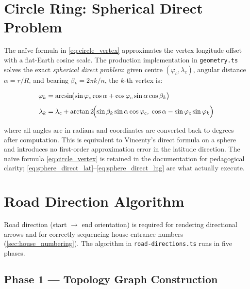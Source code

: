\documentclass[12pt,a4paper]{article}
\theoremstyle{definition}
\theoremstyle{plain}
\theoremstyle{remark}
\begin{document}
\section{Circle Ring: Spherical Direct Problem}
\label{sec:circle_ring_correct}

The na\"ive formula in \cref{eq:circle_vertex} approximates the vertex
longitude offset with a flat-Earth cosine scale. The production implementation
in \texttt{geometry.ts} solves the exact \emph{spherical direct problem}:
given centre $(\varphi_c, \lambda_c)$, angular distance
$\alpha = r / R$, and bearing $\beta_k = 2\pi k / n$, the $k$-th vertex is:

\begin{align}
  \varphi_k &= \arcsin\!\bigl(
      \sin\varphi_c \cos\alpha
    + \cos\varphi_c \sin\alpha \cos\beta_k
  \bigr)
  \label{eq:sphere_direct_lat}\\[4pt]
  \lambda_k &= \lambda_c + \arctan2\!\Bigl(
      \sin\beta_k \sin\alpha \cos\varphi_c,\;
      \cos\alpha - \sin\varphi_c \sin\varphi_k
  \Bigr)
  \label{eq:sphere_direct_lng}
\end{align}

where all angles are in radians and coordinates are converted back to
degrees after computation. This is equivalent to Vincenty's direct formula
on a sphere and introduces no first-order approximation error in the
latitude direction. The na\"ive formula \eqref{eq:circle_vertex} is retained
in the documentation for pedagogical clarity; \eqref{eq:sphere_direct_lat}--\eqref{eq:sphere_direct_lng}
are what actually execute.

\section{Road Direction Algorithm}
\label{sec:road_direction}

Road direction (start $\to$ end orientation) is required for rendering
directional arrows and for correctly sequencing house-entrance numbers
(\cref{sec:house_numbering}). The algorithm in
\texttt{road-directions.ts} runs in five phases.

\subsection{Phase 1 — Topology Graph Construction}
\end{document}
